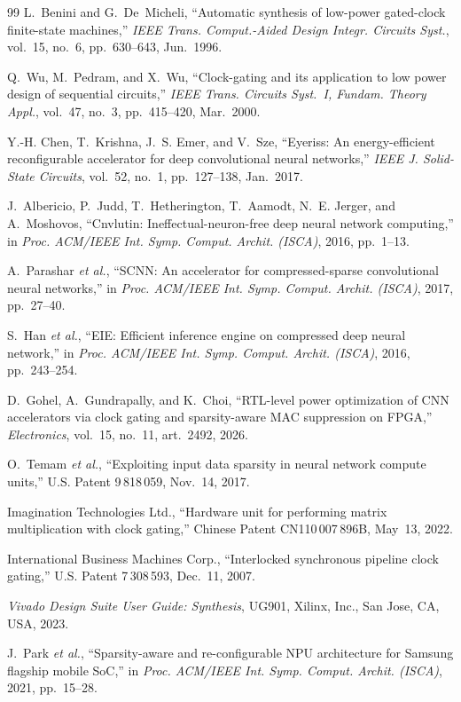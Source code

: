 \documentclass[journal,twocolumn]{IEEEtran}
\begin{document}
\begin{thebibliography}{99}
 L.~Benini and G.~De~Micheli, ``Automatic synthesis of
low-power gated-clock finite-state machines,'' \emph{IEEE Trans.
Comput.-Aided Design Integr. Circuits Syst.}, vol.~15, no.~6, pp.~630--643,
Jun.~1996.

 Q.~Wu, M.~Pedram, and X.~Wu, ``Clock-gating and its
application to low power design of sequential circuits,'' \emph{IEEE Trans.
Circuits Syst.~I, Fundam. Theory Appl.}, vol.~47, no.~3, pp.~415--420,
Mar.~2000.

 Y.-H. Chen, T.~Krishna, J.~S. Emer, and V.~Sze, ``Eyeriss:
An energy-efficient reconfigurable accelerator for deep convolutional neural
networks,'' \emph{IEEE J. Solid-State Circuits}, vol.~52, no.~1, pp.~127--138,
Jan.~2017.

 J.~Albericio, P.~Judd, T.~Hetherington, T.~Aamodt,
N.~E. Jerger, and A.~Moshovos, ``Cnvlutin: Ineffectual-neuron-free deep neural
network computing,'' in \emph{Proc. ACM/IEEE Int. Symp. Comput. Archit.
(ISCA)}, 2016, pp.~1--13.

 A.~Parashar \emph{et al.}, ``SCNN: An accelerator for
compressed-sparse convolutional neural networks,'' in \emph{Proc. ACM/IEEE
Int. Symp. Comput. Archit. (ISCA)}, 2017, pp.~27--40.

 S.~Han \emph{et al.}, ``EIE: Efficient inference engine on
compressed deep neural network,'' in \emph{Proc. ACM/IEEE Int. Symp. Comput.
Archit. (ISCA)}, 2016, pp.~243--254.

 D.~Gohel, A.~Gundrapally, and K.~Choi, ``RTL-level power
optimization of CNN accelerators via clock gating and sparsity-aware MAC
suppression on FPGA,'' \emph{Electronics}, vol.~15, no.~11, art.~2492, 2026.

 O.~Temam \emph{et al.}, ``Exploiting input data sparsity
in neural network compute units,'' U.S. Patent 9\,818\,059, Nov.~14, 2017.

 Imagination Technologies Ltd., ``Hardware unit for
performing matrix multiplication with clock gating,'' Chinese Patent
CN110\,007\,896B, May~13, 2022.

 International Business Machines Corp., ``Interlocked
synchronous pipeline clock gating,'' U.S. Patent 7\,308\,593, Dec.~11, 2007.

 \emph{Vivado Design Suite User Guide: Synthesis}, UG901,
Xilinx, Inc., San Jose, CA, USA, 2023.

 J.~Park \emph{et al.}, ``Sparsity-aware and re-configurable
NPU architecture for Samsung flagship mobile SoC,'' in \emph{Proc. ACM/IEEE
Int. Symp. Comput. Archit. (ISCA)}, 2021, pp.~15--28.
\end{thebibliography}
\end{document}
